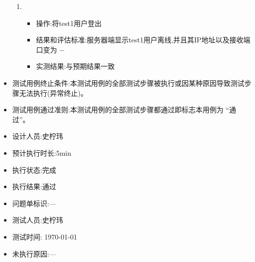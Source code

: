 \documentclass{article}
\begin{document}
\begin{itemize}
\begin{enumerate}
  \item
    \begin{itemize}
    \item 操作:将test1用户登出
    \item 结果和评估标准:服务器端显示test1用户离线,并且其IP地址以及接收端口变为 $-$
    \item 实测结果:与预期结果一致
    \end{itemize}
  \end{enumerate}
\item 测试用例终止条件:本测试用例的全部测试步骤被执行或因某种原因导致测试步骤无法执行(异常终止)。
\item 测试用例通过准则:本测试用例的全部测试步骤都通过即标志本用例为 “通过”。
\item 设计人员:史柠玮
\item 预计执行时长:5min
\item 执行状态:完成
\item 执行结果:通过
\item 问题单标识:---
\item 测试人员:史柠玮
\item 测试时间: \today
\item 未执行原因:---
\end{itemize}
\end{document}
